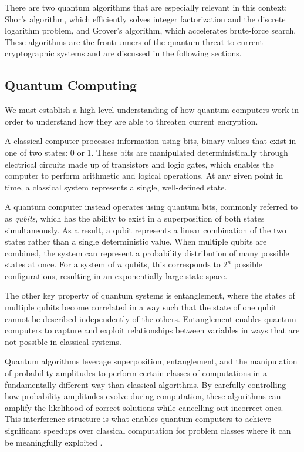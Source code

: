 There are two quantum algorithms that are especially relevant in this context: Shor's algorithm, which efficiently solves integer factorization and the discrete logarithm problem, and Grover's algorithm, which accelerates brute-force search. These algorithms are the frontrunners of the quantum threat to current cryptographic systems and are discussed in the following sections.

\subsection{Quantum Computing}
We must establish a high-level understanding of how quantum computers work in order to understand how they are able to threaten current encryption. 

A classical computer processes information using bits, binary values that exist in one of two states: 0 or 1. These bits are manipulated deterministically through electrical circuits made up of transistors and logic gates, which enables the computer to perform arithmetic and logical operations. At any given point in time, a classical system represents a single, well-defined state.

A quantum computer instead operates using quantum bits, commonly referred to as \textit{qubits}, which has the ability to exist in a superposition of both states simultaneously. As a result, a qubit represents a linear combination of the two states rather than a single deterministic value. When multiple qubits are combined, the system can represent a probability distribution of many possible states at once. For a system of $n$ qubits, this corresponds to $2^n$ possible configurations, resulting in an exponentially large state space.

The other key property of quantum systems is entanglement, where the states of multiple qubits become correlated in a way such that the state of one qubit cannot be described independently of the others. Entanglement enables quantum computers to capture and exploit relationships between variables in ways that are not possible in classical systems.

Quantum algorithms leverage superposition, entanglement, and the manipulation of probability amplitudes to perform certain classes of computations in a fundamentally different way than classical algorithms. By carefully controlling how probability amplitudes evolve during computation, these algorithms can amplify the likelihood of correct solutions while cancelling out incorrect ones. This interference structure is what enables quantum computers to achieve significant speedups over classical computation for problem classes where it can be meaningfully exploited \cite{Brassard2000Amplitude}.

